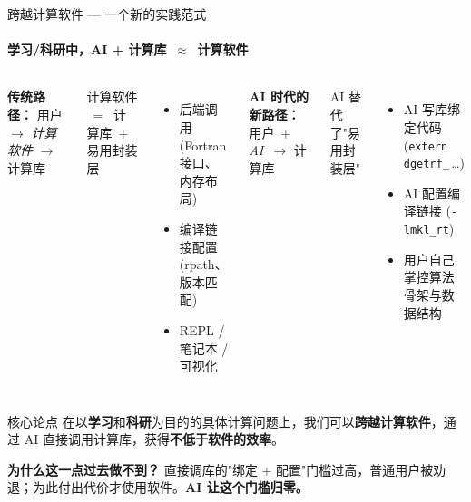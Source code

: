 \documentclass[12pt,aspectratio=169]{beamer}
\begin{document}
\begin{frame}[shrink]{跨越计算软件 — 一个新的实践范式}
\framesubtitle{学习/科研中，AI + 计算库 \,$\approx$\, 计算软件}

\small
\begin{columns}[T]
\textbf{传统路径：} 用户 $\to$ \emph{计算软件} $\to$ 计算库

\vspace{2pt}
计算软件 \, = \, 计算库 \,+\, 易用封装层
\begin{itemize}
  \item 后端调用 (Fortran 接口、内存布局)
  \item 编译链接配置 (rpath、版本匹配)
  \item REPL / 笔记本 / 可视化
\end{itemize}

\textbf{AI 时代的新路径：} 用户 \,+\, \emph{AI} \,$\to$ 计算库

\vspace{2pt}
AI 替代了"易用封装层"
\begin{itemize}
  \item AI 写库绑定代码 (\texttt{extern dgetrf\_}\,…)
  \item AI 配置编译链接 (\texttt{-lmkl\_rt})
  \item 用户自己掌控算法骨架与数据结构
\end{itemize}
\end{columns}

\vspace{6pt}
\begin{block}{核心论点}
在以\textbf{学习}和\textbf{科研}为目的的具体计算问题上，我们可以\textbf{跨越计算软件}，通过 AI 直接调用计算库，获得\textbf{不低于软件的效率}。
\end{block}

\vspace{2pt}
\textbf{为什么这一点过去做不到？} 直接调库的"绑定 + 配置"门槛过高，普通用户被劝退；为此付出代价才使用软件。\textbf{AI 让这个门槛归零。}
\end{frame}
\end{document}
